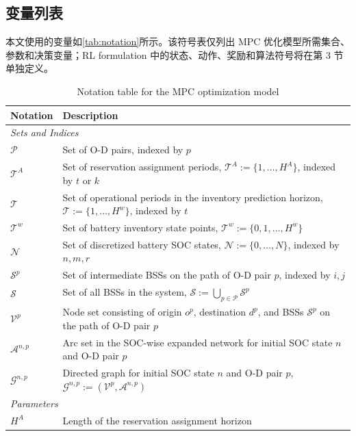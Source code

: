\documentclass[12pt,hyperref,a4paper,UTF8]{ctexart}
\begin{document}
\subsection{变量列表}

本文使用的变量如\autoref{tab:notation}所示。该符号表仅列出 MPC 优化模型所需集合、参数和决策变量；RL formulation 中的状态、动作、奖励和算法符号将在第 3 节单独定义。

\begin{table}[!htbp]
  \centering
  \caption{Notation table for the MPC optimization model}
  \label{tab:notation}
  \footnotesize
  \setlength{\tabcolsep}{2pt}
  \renewcommand{\arraystretch}{0.88}
  \begin{tabular}{@{}lp{13cm}@{}}
    \toprule
    \textbf{Notation} & \textbf{Description} \\
    \midrule
    \multicolumn{2}{l}{\textit{Sets and Indices}} \\
    $\mathcal{P}$ & Set of O-D pairs, indexed by $p$ \\
    $\mathcal{T}^{A}$ & Set of reservation assignment periods, $\mathcal{T}^{A}:=\{1,\dots,H^A\}$, indexed by $t$ or $k$ \\
    $\mathcal{T}$ & Set of operational periods in the inventory prediction horizon, $\mathcal{T}:=\{1,\dots,H^w\}$, indexed by $t$ \\
    $\mathcal{T}^{w}$ & Set of battery inventory state points, $\mathcal{T}^{w}:=\{0,1,\dots,H^w\}$ \\
    $\mathcal{N}$ & Set of discretized battery SOC states, $\mathcal{N}:=\{0,\dots,N\}$, indexed by $n,m,r$ \\
    $\mathcal{S}^{p}$ & Set of intermediate BSSs on the path of O-D pair $p$, indexed by $i,j$ \\
    $\mathcal{S}$ & Set of all BSSs in the system, $\mathcal{S}:=\bigcup_{p\in\mathcal{P}}\mathcal{S}^{p}$ \\
    $\mathcal{V}^{p}$ & Node set consisting of origin $o^{p}$, destination $d^{p}$, and BSSs $\mathcal{S}^{p}$ on the path of O-D pair $p$ \\
    $\mathcal{A}^{n,p}$ & Arc set in the SOC-wise expanded network for initial SOC state $n$ and O-D pair $p$ \\
    $\mathcal{G}^{n,p}$ & Directed graph for initial SOC state $n$ and O-D pair $p$, $\mathcal{G}^{n,p}:=(\mathcal{V}^{p},\mathcal{A}^{n,p})$ \\
    \midrule
    \multicolumn{2}{l}{\textit{Parameters}} \\
    $H^A$ & Length of the reservation assignment horizon \\

\end{tabular}
\end{table}
\end{document}
